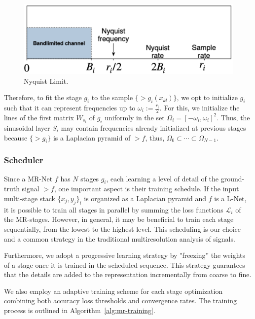 \begin{figure}[!h]
\centering
\includegraphics[width=0.7\linewidth]{img/ch4/nyquist.png}
\caption{Nyquist Limit.}
\label{f:nyquist}
\end{figure}


Therefore, to fit the stage $g_i$ to the sample $\{\gt{g}_i(x_{kl})\}$, we opt to initialize $g_i$ such that it can represent frequencies up to $\omega_i:=\frac{r_i}{2}$.
For this, we initialize the lines of the first matrix $W_{s_i}$ of $g_i$ uniformly in the set $\Omega_i=\left[-\omega_i, \omega_i\right]^2$.
Thus, the sinusoidal layer $S_i$ may contain frequencies already initialized at previous stages because $\{\gt{g}_i\}$ is a Laplacian pyramid of $\gt{f}$, thus, $\Omega_0\subset \cdots \subset \Omega_{N-1}$. 

\subsubsection{Scheduler}

Since a MR-Net $f$ has $N$ stages $g_i$, each learning a level of detail of the ground-truth signal $\gt{f}$, one important aspect is their training schedule. 
If the input multi-stage stack $\{x_j, y_j\}_i$ is organized as a Laplacian pyramid and $f$ is a L-Net, it is possible to train all stages in parallel by summing the loss functions $\mathcal{L}_i$ of the MR-stages. However, in general, it may be beneficial to train each stage sequentially, from the lowest to the highest level. This scheduling is our choice and a common strategy in the traditional multiresolution analysis of signals.

Furthermore, we adopt a progressive learning strategy by "freezing” the weights of a stage once it is trained in the scheduled sequence. This strategy guarantees that the details are added to the representation incrementally from coarse to fine.

We also employ an adaptive training scheme for each stage optimization combining both accuracy loss thresholds and convergence rates. The training process is outlined in Algorithm~\ref{alg:mr-training}.

